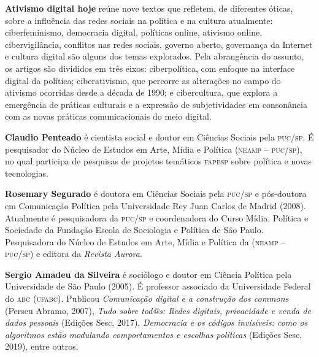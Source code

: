 \textbf{Ativismo digital hoje} reúne nove textos que refletem, de diferentes óticas, sobre a influência das redes sociais na política e na cultura atualmente: ciberfeminismo, democracia digital, políticas online, ativismo online, cibervigilância, conflitos nas redes sociais, governo aberto, governança da Internet e cultura digital são alguns dos temas explorados.
Pela abrangência do assunto, os artigos são divididos em três eixos: ciberpolítica, com enfoque na interface digital da política; ciberativismo, que percorre as alterações no campo do ativismo ocorridas desde a década de 1990; e cibercultura, que explora a emergência de práticas culturais e a expressão de subjetividades em consonância com as novas práticas comunicacionais do meio digital.

\textbf{Claudio Penteado} é cientista social e doutor em Ciências Sociais pela \textsc{puc/sp}. É pesquisador do Núcleo de Estudos em Arte, Mídia e Política (\textsc{neamp -- puc/sp}), no qual participa de pesquisas de projetos temáticos \textsc{fapesp} sobre política e novas tecnologias.

\textbf{Rosemary Segurado} é doutora em Ciências Sociais pela \textsc{puc/sp} e pós-doutora em Comunicação Política pela Universidade Rey Juan Carlos de Madrid (2008). Atualmente é pesquisadora da \textsc{puc/sp} e coordenadora do Curso Mídia, Política e Sociedade da Fundação Escola de Sociologia e Política de São Paulo. Pesquisadora do Núcleo de Estudos em Arte, Mídia e Política da (\textsc{neamp -- puc/sp}) e editora da \textit{Revista Aurora}.

\textbf{Sergio Amadeu da Silveira} é sociólogo e doutor em Ciência Política pela Universidade de São Paulo (2005). É professor associado da Universidade Federal do \textsc{abc} (\textsc{ufabc}). Publicou \textit{Comunicação digital e a construção dos commons} (Perseu Abramo, 2007), \textit{Tudo sobre tod@s: Redes digitais, privacidade e venda de dados pessoais} (Edições Sesc, 2017), \textit{Democracia e os códigos invisíveis: como os algoritmos estão modulando comportamentos e escolhas políticas} (Edições Sesc, 2019), entre outros.

